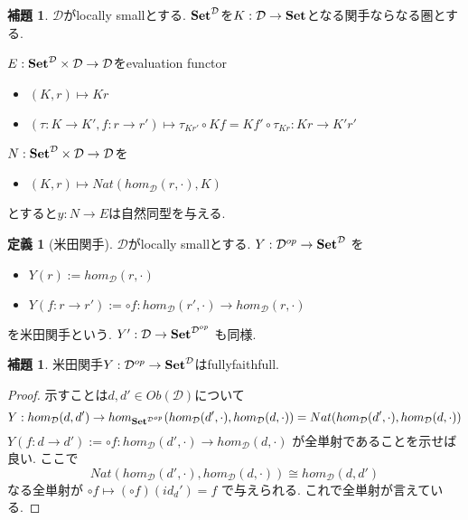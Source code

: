 \documentclass[dvipdfmx,a4paper,11pt]{article}
\theoremstyle{definition}
\newtheorem{lem}[thm]{補題}
\newtheorem{dfn}[thm]{定義}
\begin{document}
 \begin{tcolorbox}
 [colback = white, colframe = green!35!black, fonttitle = \bfseries,breakable = true]
\begin{lem}
$\mathcal{D} $がlocally smallとする. 
${\bf Set}^{\mathcal{D}}$を$K : \mathcal{D} \to {\bf Set}$となる関手ならなる圏とする.

$E: {\bf Set}^{\mathcal{D}} \times \mathcal{D} \to \mathcal{D}$をevaluation functor
\begin{itemize}
\item $(K,r) \mapsto Kr$
\item $(\tau :K\to K', f : r \to r') \mapsto  \tau_{Kr'} \circ Kf = Kf'\circ\tau_{Kr}:Kr \to K'r'$
\end{itemize}

$N: {\bf Set}^{\mathcal{D}} \times \mathcal{D} \to \mathcal{D}$を
\begin{itemize}
\item $(K,r) \mapsto  Nat(hom_{\mathcal{D}}(r, \cdot), K)$
\end{itemize}
とすると$y : N \to E$は自然同型を与える.

\end{lem}
 \end{tcolorbox}


 \begin{tcolorbox}
 [colback = white, colframe = green!35!black, fonttitle = \bfseries,breakable = true]
\begin{dfn}[米田関手]
$\mathcal{D} $がlocally smallとする. 
$Y  : \mathcal{D}^{op} \to {\bf Set}^{\mathcal{D}}$ を
\begin{itemize}
\item $Y(r) := hom_{\mathcal{D}}(r, \cdot)$
\item $Y(f:r\to r') := \circ f :hom_{\mathcal{D}}(r', \cdot)\to hom_{\mathcal{D}}(r, \cdot)  $
\end{itemize}
を米田関手という.
$Y ' : \mathcal{D} \to {\bf Set}^{\mathcal{D}^{op}}$ も同様.
\end{dfn}
\begin{lem}
米田関手$Y  : \mathcal{D}^{op} \to {\bf Set}^{\mathcal{D}}$はfullyfaithfull.
\end{lem}
\end{tcolorbox}

 \begin{proof}
示すことは$d,d' \in Ob(\mathcal{D})$について
$$
Y:
hom_{\mathcal{D}} (d,d') \to 
hom_{{\bf Set}^{\mathcal{D}^{op}}} ( hom_{\mathcal{D}}(d', \cdot), hom_{\mathcal{D}}(d, \cdot) )
=
Nat ( hom_{\mathcal{D}}(d', \cdot), hom_{\mathcal{D}}(d, \cdot) )
$$
$Y(f : d \to d') := \circ f : hom_{\mathcal{D}}(d', \cdot) \to  hom_{\mathcal{D}}(d, \cdot)$
が全単射であることを示せば良い.
ここで
$$
Nat ( hom_{\mathcal{D}}(d', \cdot), hom_{\mathcal{D}}(d, \cdot) )
\cong
hom_{\mathcal{D}}(d, d') 
$$
なる全単射が
$ \circ f \mapsto   (\circ f) (id_d') = f$
で与えられる. これで全単射が言えている. 
\end{proof}
\end{document}
